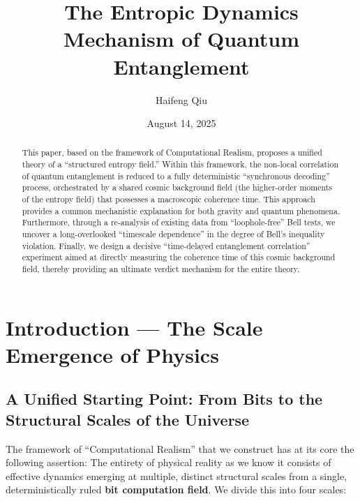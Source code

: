 \documentclass[11pt]{article}
\title{\textbf{The Entropic Dynamics Mechanism of Quantum Entanglement}}
\author{Haifeng Qiu}
\date{August 14, 2025}
\begin{document}
\maketitle

\begin{abstract}
This paper, based on the framework of Computational Realism, proposes a unified theory of a ``structured entropy field.'' Within this framework, the non-local correlation of quantum entanglement is reduced to a fully deterministic ``synchronous decoding'' process, orchestrated by a shared cosmic background field (the higher-order moments of the entropy field) that possesses a macroscopic coherence time. This approach provides a common mechanistic explanation for both gravity and quantum phenomena. Furthermore, through a re-analysis of existing data from ``loophole-free'' Bell tests, we uncover a long-overlooked ``timescale dependence'' in the degree of Bell's inequality violation. Finally, we design a decisive ``time-delayed entanglement correlation'' experiment aimed at directly measuring the coherence time of this cosmic background field, thereby providing an ultimate verdict mechanism for the entire theory.
\end{abstract}

\thispagestyle{empty} %
\newpage
\setcounter{page}{1}


\section{Introduction — The Scale Emergence of Physics}

\subsection{A Unified Starting Point: From Bits to the Structural Scales of the Universe}

The framework of ``Computational Realism'' that we construct has at its core the following assertion: The entirety of physical reality as we know it consists of effective dynamics emerging at multiple, distinct structural scales from a single, deterministically ruled \textbf{bit computation field}. We divide this into four scales:
\end{document}
